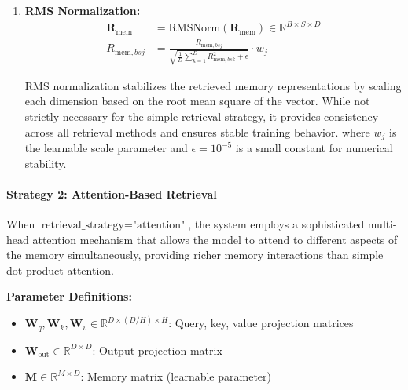 \documentclass{article}
\begin{document}
\begin{enumerate}
\textbf{Asymptotic Complexity:} $O(B \cdot S \cdot D \cdot M)$
\begin{itemize}
\item Attention computation: $O(B \cdot S \cdot D \cdot M)$
\item Softmax computation: $O(B \cdot S \cdot M)$
\item Memory retrieval: $O(B \cdot S \cdot M \cdot D)$
\end{itemize}

\textbf{Memory Complexity:} $O(B \cdot S \cdot M + M \cdot D)$
\begin{itemize}
\item Attention matrix: $O(B \cdot S \cdot M)$
\item Memory matrix: $O(M \cdot D)$
\item Intermediate tensors: $O(B \cdot S \cdot D)$
\end{itemize}

\item \textbf{RMS Normalization:}
\begin{align}
\mathbf{R}_{\text{mem}} &= \text{RMSNorm}(\mathbf{R}_{\text{mem}}) \in \mathbb{R}^{B \times S \times D} \\
R_{\text{mem},bsj} &= \frac{R_{\text{mem},bsj}}{\sqrt{\frac{1}{D}\sum_{k=1}^{D} R_{\text{mem},bsk}^2 + \epsilon}} \cdot w_j
\end{align}

RMS normalization stabilizes the retrieved memory representations by scaling each dimension based on the root mean square of the vector. While not strictly necessary for the simple retrieval strategy, it provides consistency across all retrieval methods and ensures stable training behavior.
where $w_j$ is the learnable scale parameter and $\epsilon = 10^{-5}$ is a small constant for numerical stability.
\end{enumerate}

\paragraph{Strategy 2: Attention-Based Retrieval}

When $\text{retrieval\_strategy} = \text{"attention"}$, the system employs a sophisticated multi-head attention mechanism that allows the model to attend to different aspects of the memory simultaneously, providing richer memory interactions than simple dot-product attention.

\textbf{Parameter Definitions:}
\begin{itemize}
\item $\mathbf{W}_q, \mathbf{W}_k, \mathbf{W}_v \in \mathbb{R}^{D \times (D/H) \times H}$: Query, key, value projection matrices
\item $\mathbf{W}_{\text{out}} \in \mathbb{R}^{D \times D}$: Output projection matrix
\item $\mathbf{M} \in \mathbb{R}^{M \times D}$: Memory matrix (learnable parameter)
\end{itemize}
\end{document}
